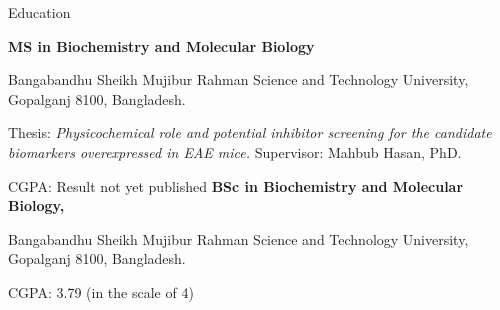 \begin{rubric}{Education}

\entry*[2020 - 2022]%
	\textbf{MS in Biochemistry and Molecular Biology}\par 
	Bangabandhu Sheikh Mujibur Rahman Science and Technology University, Gopalganj 8100, Bangladesh.\par
	Thesis: \emph{Physicochemical role and potential inhibitor screening for the candidate biomarkers overexpressed in EAE mice.} Supervisor: Mahbub Hasan, PhD. \par
	CGPA: Result not yet published
%
\entry*[2016 - 2019]%
	\textbf{BSc in Biochemistry and Molecular Biology, }\par
	Bangabandhu Sheikh Mujibur Rahman Science and Technology University, Gopalganj 8100, Bangladesh.\par
	CGPA: 3.79 (in the scale of 4)
\end{rubric}